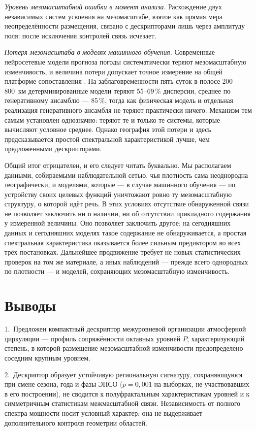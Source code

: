 \documentclass[11pt,a4paper]{article}
\begin{document}
\emph{Уровень мезомасштабной ошибки в момент анализа.} Расхождение двух независимых систем усвоения на мезомасштабе, взятое как прямая мера неопределённости размещения, связано с дескрипторами лишь через амплитуду поля: после исключения контролей связь исчезает.

\emph{Потеря мезомасштаба в моделях машинного обучения.} Современные нейросетевые модели прогноза погоды \cite{Lam2023,Bi2023,Price2025} систематически теряют мезомасштабную изменчивость, и величина потери допускает точное измерение на общей платформе сопоставления \cite{Rasp2024}. На заблаговременности пять суток в полосе 200--800~км детерминированные модели теряют 55--69\,\% дисперсии, среднее по генеративному ансамблю --- 85\,\%, тогда как физическая модель и отдельная реализация генеративного ансамбля не теряют практически ничего. Механизм тем самым установлен однозначно: теряют те и только те системы, которые вычисляют условное среднее. Однако география этой потери и здесь предсказывается простой спектральной характеристикой лучше, чем предложенными дескрипторами.

Общий итог отрицателен, и его следует читать буквально. Мы располагаем данными, собираемыми наблюдательной сетью, чья плотность сама неоднородна географически, и моделями, которые --- в случае машинного обучения --- по устройству своих целевых функций уничтожают ровно ту мезомасштабную структуру, о которой идёт речь. В этих условиях отсутствие обнаруженной связи не позволяет заключить ни о наличии, ни об отсутствии прикладного содержания у измеренной величины. Оно позволяет заключить другое: на сегодняшних данных и сегодняшних моделях такое содержание не обнаруживается, а простая спектральная характеристика оказывается более сильным предиктором во всех трёх постановках. Дальнейшее продвижение требует не новых статистических проверок на том же материале, а иных наблюдений --- прежде всего однородных по плотности --- и моделей, сохраняющих мезомасштабную изменчивость.

\section{Выводы}
\label{sec:conclusion}

1.~Предложен компактный дескриптор межуровневой организации атмосферной циркуляции --- профиль сопряжённости октавных уровней $P$, характеризующий степень, в которой размещение мезомасштабной изменчивости предопределено соседним крупным уровнем.

2.~Дескриптор образует устойчивую региональную сигнатуру, сохраняющуюся при смене сезона, года и фазы ЭНСО ($p=0{,}001$ на выборках, не участвовавших в его построении), не сводится к полуфрактальным характеристикам уровней и к симметричным статистикам межмасштабной связи. Независимость от полного спектра мощности носит условный характер: она не выдерживает дополнительного контроля геометрии областей.
\end{document}
